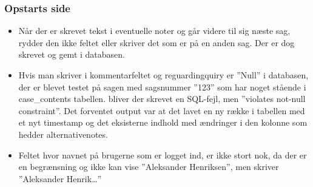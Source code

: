 \subsubsection{Opstarts side}
\begin{itemize}
\item Når der er skrevet tekst i eventuelle noter og går videre til sig næste sag, rydder den ikke feltet eller skriver det som er på en anden sag. Der er dog skrevet og gemt i databasen.
\item Hvis man skriver i kommentarfeltet og reguardingquiry er ”Null” i databasen, der er blevet testet på sagen med sagsnummer ”123” som har noget stående i case\_contents tabellen. bliver der skrevet en SQL-fejl, men ”violates not-null constraint”.  Det forventet output var at det lavet en ny række i tabellen med et nyt timestamp og det eksisterne indhold med ændringer i den kolonne som hedder alternativenotes.  
\item Feltet hvor navnet på brugerne som er logget ind, er ikke stort nok, da der er en begrænsning og ikke kan vise ”Aleksander Henriksen”, men skriver ”Aleksander Henrik…”
\end{itemize}
